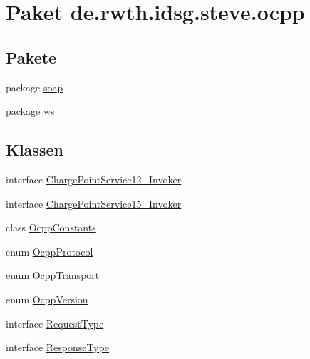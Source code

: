 \hypertarget{namespacede_1_1rwth_1_1idsg_1_1steve_1_1ocpp}{\section{Paket de.\-rwth.\-idsg.\-steve.\-ocpp}
\label{namespacede_1_1rwth_1_1idsg_1_1steve_1_1ocpp}
}
\subsection*{Pakete}
\begin{DoxyCompactItemize}
\item 
package \hyperlink{namespacede_1_1rwth_1_1idsg_1_1steve_1_1ocpp_1_1soap}{soap}
\item 
package \hyperlink{namespacede_1_1rwth_1_1idsg_1_1steve_1_1ocpp_1_1ws}{ws}
\end{DoxyCompactItemize}
\subsection*{Klassen}
\begin{DoxyCompactItemize}
\item 
interface \hyperlink{interfacede_1_1rwth_1_1idsg_1_1steve_1_1ocpp_1_1_charge_point_service12___invoker}{Charge\-Point\-Service12\-\_\-\-Invoker}
\item 
interface \hyperlink{interfacede_1_1rwth_1_1idsg_1_1steve_1_1ocpp_1_1_charge_point_service15___invoker}{Charge\-Point\-Service15\-\_\-\-Invoker}
\item 
class \hyperlink{classde_1_1rwth_1_1idsg_1_1steve_1_1ocpp_1_1_ocpp_constants}{Ocpp\-Constants}
\item 
enum \hyperlink{enumde_1_1rwth_1_1idsg_1_1steve_1_1ocpp_1_1_ocpp_protocol}{Ocpp\-Protocol}
\item 
enum \hyperlink{enumde_1_1rwth_1_1idsg_1_1steve_1_1ocpp_1_1_ocpp_transport}{Ocpp\-Transport}
\item 
enum \hyperlink{enumde_1_1rwth_1_1idsg_1_1steve_1_1ocpp_1_1_ocpp_version}{Ocpp\-Version}
\item 
interface \hyperlink{interfacede_1_1rwth_1_1idsg_1_1steve_1_1ocpp_1_1_request_type}{Request\-Type}
\item 
interface \hyperlink{interfacede_1_1rwth_1_1idsg_1_1steve_1_1ocpp_1_1_response_type}{Response\-Type}
\end{DoxyCompactItemize}
